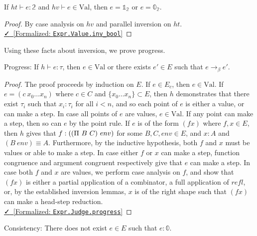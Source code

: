 \documentclass{lmcs}
\newcommand{\val}{\text{Val}}
\newcommand{\leanlink}[2]{
  \href{#1}{\textcolor{black}\faCheck~[Formalized: \texttt{#2}]}%
}
\newcommand{\arr}{\rightarrow}
\newcommand{\barr}{\arr_{\beta}}
\begin{document}
\begin{lem}\label{inv:bool}
  If \(ht \vdash e : \mathbb{2}\) and \(hv \vdash e \in \val\), then \(e = \mathbb{1}_\mathbb{2}\) or \(e = \mathbb{0}_\mathbb{2}\).
\end{lem}

\begin{proof}
  By case analysis on \(hv\) and parallel inversion on \(ht\).\\
  \noindent \leanlink{https://github.com/lexzaiello/DCC/blob/fb7acf6d9644df7d13c809d12609b59eaca5c763/Dcc/Metatheory/Progress.lean\#L616}{Expr.Value.inv\_bool}
\end{proof}

Using these facts about inversion, we prove progress.

\begin{thm}\label{thm:progress}
  Progress: If \(h \vdash e : \tau\), then \(e \in \val\) or there exists \(e' \in E\) such that \(e \barr e'\).
\end{thm}

\begin{proof}
  The proof proceeds by induction on \(E\). If \(e \in E_c\), then \(e \in \val\). If \(e = (c\ x_0 \ldots x_n)\) where \(c \in C\) and \(\{x_0 \ldots x_n\} \subset E\), then \(h\) demonstrates that there exist \(\tau_i\) such that \(x_i : \tau_i\) for all \(i < n\), and so each point of \(e\) is either a value, or can make a step. In case all points of \(e\) are values, \(e \in \val\). If any point can make a step, then so can \(e\) by the point rule. If \(e\) is of the form \((f x)\) where \(f, x \in E\), then \(h\) gives that \(f : (\comb[\Pi][B][C]\ env)\) for some \(B, C, env \in E\), and \(x : A\) and \((B\ env) \equiv A\). Furthermore, by the inductive hypothesis, both \(f\) and \(x\) must be values or able to make a step. In case either \(f\) or \(x\) can make a step, function congruence and argument congruent respectively give that \(e\) can make a step. In case both \(f\) and \(x\) are values, we perform case analysis on \(f\), and show that \((f x)\) is either a partial application of a combinator, a full application of \(refl\), or, by the established inversion lemmas, \(x\) is of the right shape such that \((f x)\) can make a head-step reduction.\\
\noindent \leanlink{https://github.com/lexzaiello/DCC/blob/fb7acf6d9644df7d13c809d12609b59eaca5c763/Dcc/Metatheory/Progress.lean\#L957}{Expr.Judge.progress}
\end{proof}

\begin{thm}
  Consistency: There does not exist \(e \in E\) such that \(e : \mathbb{0}\).
\end{thm}
\end{document}
